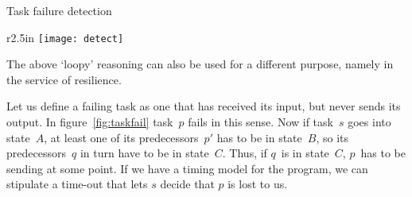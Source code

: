  {Task failure detection}

\begin{wrapfigure}{r}{2.5in}
  \texttt{[image: detect]}
  \caption{Chain of reasoning in theorem~\ref{th:resil}.}
  \label{fig:taskfail}
\end{wrapfigure}
%
The above `loopy' reasoning can also be used for a different purpose,
namely in the service of resilience. 

Let us define a failing task as one that has received its input, but
never sends its output. In figure~\ref{fig:taskfail} task~$p$ fails in
this sense. Now if task~$s$ goes into state~$A$, at least one of its
predecessors~$p'$ has to be in state~$B$, so its predecessors~$q$ in
turn have to be in state~$C$. Thus, if $q$~is in state~$C$, $p$~has to
be sending at some point. If we have a timing model for the program,
we can stipulate a time-out that lets $s$ decide that $p$ is lost to
us.

